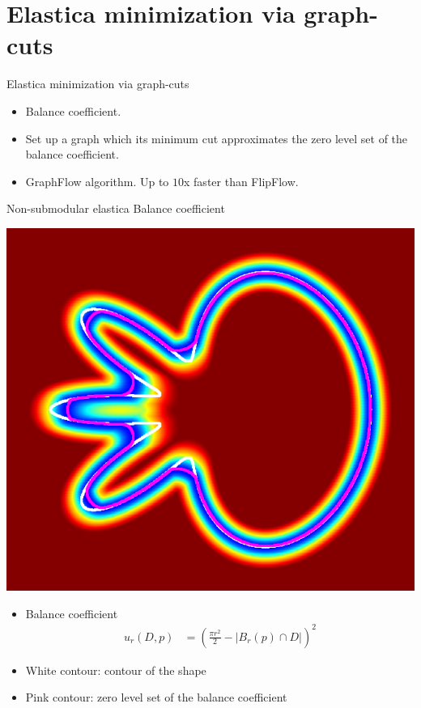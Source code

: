 \section{Elastica minimization via graph-cuts}

\begin{frame}
\center
\huge
Elastica minimization via graph-cuts

\vspace{2em}

\begin{minipage}{0.7\textwidth}
\normalsize
\begin{itemize}
\item{Balance coefficient.}
\item{Set up a graph which its minimum cut approximates the zero level set of the balance coefficient.}
\item{GraphFlow algorithm. Up to $10$x faster than FlipFlow.}
\end{itemize}
\end{minipage}

\end{frame}

\begin{frame}
{Non-submodular elastica}
{Balance coefficient}
\begin{minipage}{0.5\textwidth}
\center
\includegraphics[scale=0.2]{figures/non-submodular-elastica/balance-coefficient-zero-level-set.png}
\end{minipage}
\begin{minipage}{0.49\textwidth}
\footnotesize
\begin{itemize}
\item{Balance coefficient}
\begin{align*}
u_r(D,p) &= \left( \frac{\pi r^2}{2} - |B_r(p) \cap D| \right)^2
\end{align*}
\item{White contour: contour of the shape}
\item{Pink contour: zero level set of the balance coefficient}
\end{itemize}
\end{minipage}
\end{frame}

